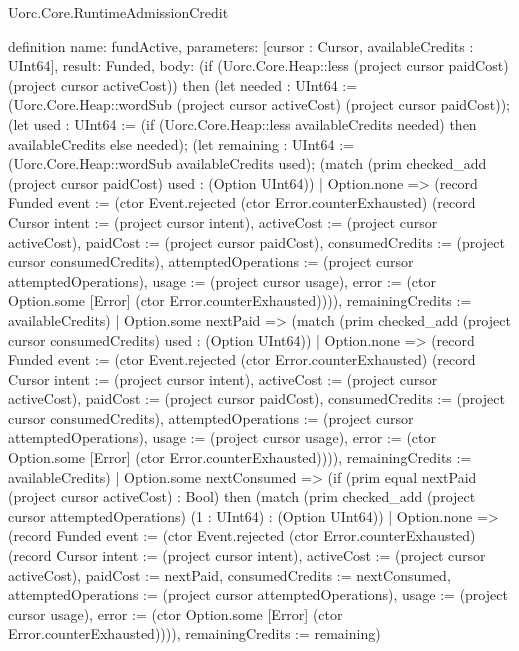 \begin{lexlean}{Uorc.Core.RuntimeAdmissionCredit}
\begin{semanticmodule}
definition{
  name: fundActive,
  parameters: [cursor : Cursor, availableCredits : UInt64],
  result: Funded,
  body: (if (Uorc.Core.Heap::less (project cursor paidCost) (project cursor activeCost)) then (let needed : UInt64 := (Uorc.Core.Heap::wordSub (project cursor activeCost) (project cursor paidCost)); (let used : UInt64 := (if (Uorc.Core.Heap::less availableCredits needed) then availableCredits else needed); (let remaining : UInt64 := (Uorc.Core.Heap::wordSub availableCredits used); (match (prim checked_add (project cursor paidCost) used : (Option UInt64))
    | Option.none => (record Funded {event := (ctor Event.rejected (ctor Error.counterExhausted) (record Cursor {intent := (project cursor intent), activeCost := (project cursor activeCost), paidCost := (project cursor paidCost), consumedCredits := (project cursor consumedCredits), attemptedOperations := (project cursor attemptedOperations), usage := (project cursor usage), error := (ctor Option.some [Error] (ctor Error.counterExhausted))})), remainingCredits := availableCredits})
    | Option.some nextPaid => (match (prim checked_add (project cursor consumedCredits) used : (Option UInt64))
      | Option.none => (record Funded {event := (ctor Event.rejected (ctor Error.counterExhausted) (record Cursor {intent := (project cursor intent), activeCost := (project cursor activeCost), paidCost := (project cursor paidCost), consumedCredits := (project cursor consumedCredits), attemptedOperations := (project cursor attemptedOperations), usage := (project cursor usage), error := (ctor Option.some [Error] (ctor Error.counterExhausted))})), remainingCredits := availableCredits})
      | Option.some nextConsumed => (if (prim equal nextPaid (project cursor activeCost) : Bool) then (match (prim checked_add (project cursor attemptedOperations) (1 : UInt64) : (Option UInt64))
        | Option.none => (record Funded {event := (ctor Event.rejected (ctor Error.counterExhausted) (record Cursor {intent := (project cursor intent), activeCost := (project cursor activeCost), paidCost := nextPaid, consumedCredits := nextConsumed, attemptedOperations := (project cursor attemptedOperations), usage := (project cursor usage), error := (ctor Option.some [Error] (ctor Error.counterExhausted))})), remainingCredits := remaining})
}
\end{semanticmodule}
\end{lexlean}
